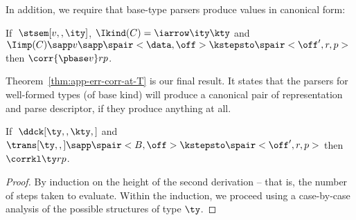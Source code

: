 In addition, we require that base-type parsers produce values in canonical form:
\begin{condition}
  \label{cond:base-types-cf}
  If $\;\stsem[v,,\ity]$, $\Ikind(C) = \iarrow \ity \kty$ and $\Iimp(C)
  \sapp v \sapp \spair<\data,\off> \kstepsto \spair<\off',r,p>$ then
  $\corr {\pbase v} r p $.
\end{condition}

Theorem~\ref{thm:app-err-corr-at-T} is our final result. It 
states that the parsers for
well-formed types (of base kind) will produce a canonical pair of
representation and parse descriptor, if they produce anything at all.

\begin{theorem}
\label{thm:app-err-corr-at-T}
If $\; \ddck[\ty,,\kty,]$ and $\trans[\ty,,] \sapp \spair<B,\off> \kstepsto
  \spair<\off',r,p>$ then $\corrkl \ty r p$.
\end{theorem}

\begin{proof}
  By induction on the height of the second derivation -- that is, the
  number of steps taken to evaluate. Within the induction, we proceed
  using a case-by-case analysis of the possible structures of type
  $\ty$.  
\end{proof}






